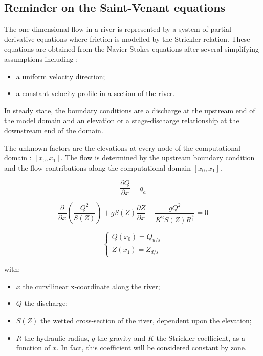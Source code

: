 \subsection{Reminder on the Saint-Venant equations}

The one-dimensional flow in a river is represented by a system of partial derivative equations where friction is modelled by the Strickler relation. These equations are obtained from the Navier-Stokes equations after several simplifying assumptions including :

\begin{itemize}
 \item a uniform velocity direction;
 \item a constant velocity profile in a section of the river.
\end{itemize}

In steady state, the boundary conditions are a discharge at the upstream end of the model domain and an elevation or a stage-discharge relationship at the downstream end of the domain.

The unknown factors are the elevations at every node of the computational domain : $[x_0,x_1]$. The flow is determined by the upstream boundary condition and the flow contributions along the computational domain $[x_0,x_1]$.

\begin{equation}
  \label{ContCas}
  \frac{\partial Q}{\partial x}= q_a
\end{equation}

\begin{equation}
  \label{DynCas}
  \frac{\partial}{\partial x} \left ( \frac{Q^2}{S(Z)} \right ) + g S(Z) \frac{\partial Z}{\partial x} + \frac{g Q^2}{K^2 S(Z) R^{\frac{4}{3}}} = 0
\end{equation}

\begin{equation}
 \left \lbrace
  \begin{array}{l}
    Q(x_0) = Q_{u/s} \\
    Z(x_1) = Z_{d/s}
  \end{array}
 \right.
\end{equation}

with:
\begin{itemize}
  \item $x$ the curvilinear x-coordinate along the river;
  \item $Q$ the discharge;
  \item $S(Z)$ the wetted cross-section of the river, dependent upon the elevation;
  \item $R$ the hydraulic radius, $g$ the gravity and $K$ the Strickler coefficient, as a function of $x$. In fact, this coefficient will be considered constant by zone.
\end{itemize}

